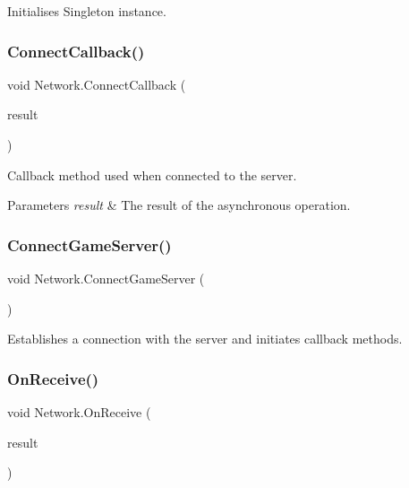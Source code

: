 Initialises Singleton instance. 

\mbox{\label{class_network_ac1b0ebf3c19d645003a1238a0fa1ad64}} 
\subsubsection{\texorpdfstring{ConnectCallback()}{ConnectCallback()}}
{\footnotesize\ttfamily void Network.\+Connect\+Callback (\begin{DoxyParamCaption}\item[{I\+Async\+Result}]{result }\end{DoxyParamCaption})\hspace{0.3cm}{\ttfamily [private]}}



Callback method used when connected to the server. 


\begin{DoxyParams}{Parameters}
{\em result} & The result of the asynchronous operation.\\
\hline
\end{DoxyParams}
\mbox{\label{class_network_aace0678d55f269c25983131dd673e857}} 
\subsubsection{\texorpdfstring{ConnectGameServer()}{ConnectGameServer()}}
{\footnotesize\ttfamily void Network.\+Connect\+Game\+Server (\begin{DoxyParamCaption}{ }\end{DoxyParamCaption})\hspace{0.3cm}{\ttfamily [private]}}



Establishes a connection with the server and initiates callback methods. 

\mbox{\label{class_network_af1c962bbf03c6221e052ed8fd5c174a9}} 
\subsubsection{\texorpdfstring{OnReceive()}{OnReceive()}}
{\footnotesize\ttfamily void Network.\+On\+Receive (\begin{DoxyParamCaption}\item[{I\+Async\+Result}]{result }\end{DoxyParamCaption})\hspace{0.3cm}{\ttfamily [private]}}



